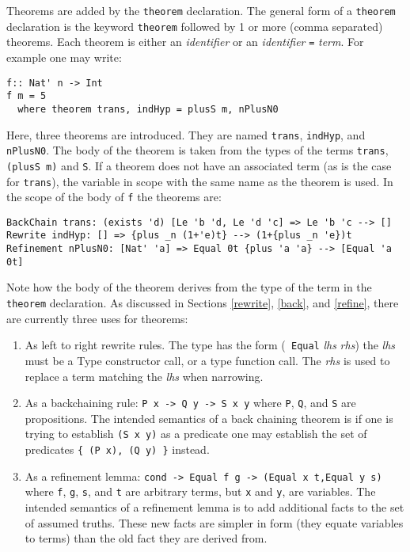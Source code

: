 \documentclass[11pt,twoside]{article}
\begin{document}
Theorems are added by the {\tt theorem} declaration.
The general form of a {\tt theorem} declaration is the keyword
{\tt theorem} followed by 1 or more (comma separated) theorems.
Each theorem is either an {\it identifier} or an {\it identifier} \verb+=+ {\it term}.
For example one may write:
\begin{verbatim}
f:: Nat' n -> Int
f m = 5
  where theorem trans, indHyp = plusS m, nPlusN0
\end{verbatim}
Here, three theorems are introduced. They are named {\tt trans}, {\tt indHyp}, and
{\tt nPlusN0}. The body of the theorem is taken from the types
of the terms {\tt trans}, {\tt (plusS m)} and {\tt S}. If a theorem
does not have an associated term (as is the case for {\tt trans}), the
variable in scope with the same name as the theorem is used.
In the scope of the body of {\tt f} the theorems are:
\begin{verbatim}
BackChain trans: (exists 'd) [Le 'b 'd, Le 'd 'c] => Le 'b 'c --> []
Rewrite indHyp: [] => {plus _n (1+'e)t} --> (1+{plus _n 'e})t
Refinement nPlusN0: [Nat' 'a] => Equal 0t {plus 'a 'a} --> [Equal 'a 0t]
\end{verbatim}

Note how the body of the theorem derives from the type of the term in the {\tt
theorem} declaration. As discussed in Sections \ref{rewrite}, \ref{back},
and \ref{refine}, there are currently three uses for theorems:

\begin{enumerate} \item As left to right rewrite rules. The type has the form ({\tt
Equal} {\it lhs} {\it rhs}) the {\it lhs} must be a Type constructor call, or a type
function call. The {\it rhs} is used to replace a term matching the {\it lhs} when narrowing.

\item As a backchaining rule: \verb+P x -> Q y -> S x y+   where {\tt P}, {\tt Q},
and {\tt S} are propositions. The intended semantics of a back chaining theorem
is if one is trying to establish \verb+(S x y)+ as a predicate
one may establish the set of predicates \verb+{ (P x), (Q y) }+ instead.

\item As a refinement lemma:  \verb+cond -> Equal f g -> (Equal x t,Equal y s)+ where
{\tt f}, {\tt g}, {\tt s}, and {\tt t} are arbitrary terms, but {\tt x} and {\tt y},
are variables.  The intended semantics of a refinement lemma is to add
additional facts to the set of assumed truths. These new facts are
simpler in form (they equate variables to terms) than the old fact they are
derived from.

\end{enumerate}
\end{document}
